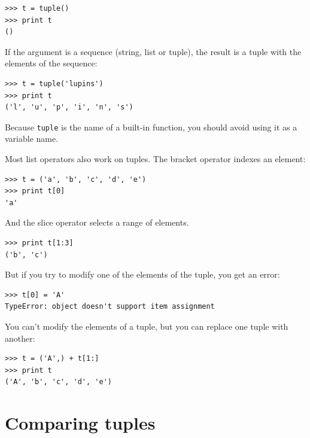 \documentclass[10pt]{book}
\begin{document}

\beforeverb
\begin{verbatim}
>>> t = tuple()
>>> print t
()
\end{verbatim}
\afterverb
%
If the argument is a sequence (string, list or tuple), the result
is a tuple with the elements of the sequence:

\beforeverb
\begin{verbatim}
>>> t = tuple('lupins')
>>> print t
('l', 'u', 'p', 'i', 'n', 's')
\end{verbatim}
\afterverb
%
Because {\tt tuple} is the name of a built-in function, you should
avoid using it as a variable name.

Most list operators also work on tuples.  The bracket operator
indexes an element:


\beforeverb
\begin{verbatim}
>>> t = ('a', 'b', 'c', 'd', 'e')
>>> print t[0]
'a'
\end{verbatim}
\afterverb
%
And the slice operator selects a range of elements.


\beforeverb
\begin{verbatim}
>>> print t[1:3]
('b', 'c')
\end{verbatim}
\afterverb
%
But if you try to modify one of the elements of the tuple, you get
an error:


\beforeverb
\begin{verbatim}
>>> t[0] = 'A'
TypeError: object doesn't support item assignment
\end{verbatim}
\afterverb
%
You can't modify the elements of a tuple, but you can replace
one tuple with another:

\beforeverb
\begin{verbatim}
>>> t = ('A',) + t[1:]
>>> print t
('A', 'b', 'c', 'd', 'e')
\end{verbatim}
\afterverb
%

\section{Comparing tuples}

\end{document}
